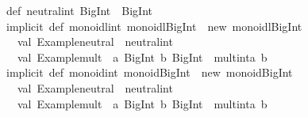 \begin{isabellebody}
\begin{isamarkuptext}
{}\isanewline
\isanewline
def\ neutral{}int{}\ BigInt\ {}\ BigInt{}{}{}\isanewline
\isanewline
implicit\ def\ monoidl{}int{}\ monoidl{}BigInt{}\ {}\ new\ monoidl{}BigInt{}\ {}\isanewline
\ \ val\ {}Example{}neutral{}\ {}\ neutral{}int\isanewline
\ \ val\ {}Example{}mult{}\ {}\ {}a{}\ BigInt{}\ b{}\ BigInt{}\ {}{}\ mult{}int{}a{}\ b{}\isanewline
{}\isanewline
\isanewline
implicit\ def\ monoid{}int{}\ monoid{}BigInt{}\ {}\ new\ monoid{}BigInt{}\ {}\isanewline
\ \ val\ {}Example{}neutral{}\ {}\ neutral{}int\isanewline
\ \ val\ {}Example{}mult{}\ {}\ {}a{}\ BigInt{}\ b{}\ BigInt{}\ {}{}\ mult{}int{}a{}\ b{}\isanewline

\end{isamarkuptext}
\end{isabellebody}
